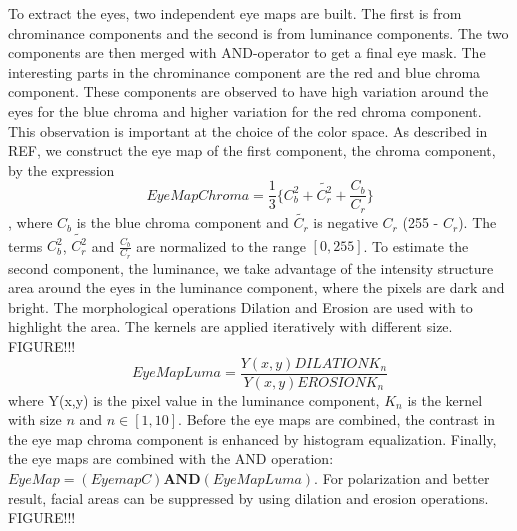 


To extract the eyes, two independent eye maps are built. The first is from chrominance components and the second is from luminance components. The two components are then merged with AND-operator to get a final eye mask. The interesting parts in the chrominance component are the red and blue chroma component. These components are observed to have high variation around the eyes for the blue chroma and higher variation for the red chroma component. This observation is important at the choice of the color space. As described in REF, we construct the eye map of the first component, the chroma component, by the expression
\newline
\newline
\begin{equation}
EyeMapChroma = \frac{1}{3} \lbrace C_b^2 + \tilde{C_r^2} + \frac{C_b}{C_r} \rbrace
\end{equation}
\newline
\newline
, where $C_b$ is the blue chroma component and $\tilde{C_r}$ is negative $C_r$ (255 - $C_r$). The terms $C_b^2$, $\tilde{C_r^2}$ and $\frac{C_b}{C_r}$ are normalized to the range $[0, 255]$.
\newline
\newline
To estimate the second component, the luminance, we take advantage of the intensity structure area around the eyes in the luminance component, where the pixels are dark and bright. The morphological operations Dilation and Erosion are used with to highlight the area.  The kernels are applied iteratively with different size. FIGURE!!!
\newline
\newline
\begin{equation}
EyeMapLuma = \frac{Y(x,y) DILATION K_n}{Y(x,y) EROSION K_n}
\end{equation}
\newline
\newline
where Y(x,y) is the pixel value in the luminance component, $K_n$ is the kernel with size $n$ and $ n \in [1,10]$.
\newline
Before the eye maps are combined, the contrast in the eye map chroma component is enhanced by histogram equalization. Finally, the eye maps are combined with the AND operation: $EyeMap = (EyemapC) \textbf{AND} (EyeMapLuma)$. For polarization and better result, facial areas can be suppressed by using dilation and erosion operations. FIGURE!!!


